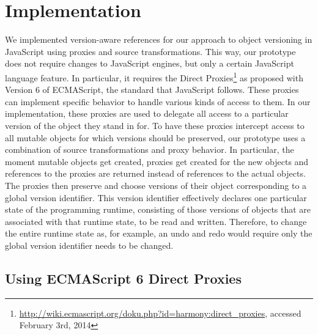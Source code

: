 \chapter{Implementation} \label{chapter:IMPLEMENTATION}

We implemented version-aware references for our approach to object versioning in JavaScript using proxies and source transformations.
This way, our prototype does not require changes to JavaScript engines, but only a certain JavaScript language feature.
In particular, it requires the Direct Proxies\footnote{\url{http://wiki.ecmascript.org/doku.php?id=harmony:direct_proxies}, accessed February 3rd, 2014} as proposed with Version 6 of ECMAScript, the standard that JavaScript follows.
These proxies can implement specific behavior to handle various kinds of access to them.
In our implementation, these proxies are used to delegate all access to a particular version of the object they stand in for.
To have these proxies intercept access to all mutable objects for which versions should be preserved, our prototype uses a combination of source transformations and proxy behavior.
In particular, the moment mutable objects get created, proxies get created for the new objects and references to the proxies are returned instead of references to the actual objects.
The proxies then preserve and choose versions of their object corresponding to a global version identifier.
This version identifier effectively declares one particular state of the programming runtime, consisting of those versions of objects that are associated with that runtime state, to be read and written.
Therefore, to change the entire runtime state as, for example, an undo and redo would require only the global version identifier needs to be changed.








\section{Using ECMAScript 6 Direct Proxies} \label{sec:IMPLEMENTATION:1}

